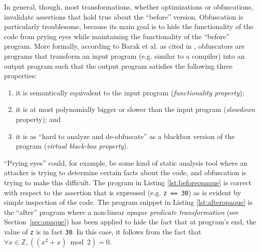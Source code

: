\documentclass[compsoc,conference,a4paper,10pt,times]{IEEEtran}
\begin{document}
In general, though, most transformations, whether optimizations or obfuscations,
invalidate assertions that hold true about the ``before'' version. Obfuscation is particularly troublesome, because its main goal is to hide the functionality of the code from prying eyes while maintaining the functionality of the ``before'' program. More formally, according to Barak et al. as cited in \cite{BanescuCGNP16}, obfuscators are programs that transform an input program (e.g. similar to a compiler) into an output program such that the output program satisfies the following three properties:
\begin{enumerate}
   \item it is semantically equivalent to the input program (\emph{functionality property}); \label{itm:firstproperty}
   \item it is at most polynomially bigger or slower than the input program (\emph{slowdown} property); and \label{itm:secondproperty}
   \item it is as ``hard to analyze and de-obfuscate'' as a blackbox version of the program (\emph{virtual black-box property}). \label{itm:thirdproperty}
\end{enumerate}
``Prying eyes'' could, for example, be some kind of static analysis tool where an attacker is trying to determine certain facts about the code, and obfuscation is trying to make this difficult. The program in Listing \ref{lst:beforeopaque} is correct with respect to the assertion that is expressed (e.g. \texttt{z == 30}) as is evident by simple inspection of the code. The program snippet in Listing \ref{lst:afteropaque} is the ``after'' program where a non-linear \emph{opaque predicate transformation} (see Section~\ref{sec:opaque}) has been applied to hide the fact that at program's end, the value of \texttt{z} is in fact \texttt{30}. In this case, it follows from the fact that $\forall x \in \mathbb{Z}, ((x^2 + x)\bmod 2) = 0$. 
\end{document}
